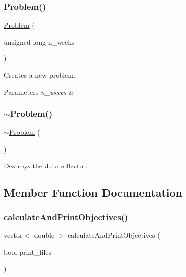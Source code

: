 \subsubsection{\texorpdfstring{Problem()}{Problem()}}
{\footnotesize\ttfamily \mbox{\hyperlink{classProblem}{Problem}} (\begin{DoxyParamCaption}\item[{unsigned long}]{n\+\_\+weeks }\end{DoxyParamCaption})}



Creates a new problem. 


\begin{DoxyParams}{Parameters}
{\em n\+\_\+weeks} & \\
\hline
\end{DoxyParams}
\mbox{\label{classProblem_a3f26d4abc0bb8633f315458b8e1b88b9_a3f26d4abc0bb8633f315458b8e1b88b9}} 
\subsubsection{\texorpdfstring{$\sim$\+Problem()}{~Problem()}}
{\footnotesize\ttfamily $\sim$\mbox{\hyperlink{classProblem}{Problem}} (\begin{DoxyParamCaption}{ }\end{DoxyParamCaption})\hspace{0.3cm}{\ttfamily [virtual]}}



Destroys the data collector. 



\subsection{Member Function Documentation}
\mbox{\label{classProblem_ad4e2da403a38f3ee5d4de19ffdfbd148_ad4e2da403a38f3ee5d4de19ffdfbd148}} 
\subsubsection{\texorpdfstring{calculate\+And\+Print\+Objectives()}{calculateAndPrintObjectives()}}
{\footnotesize\ttfamily vector$<$ double $>$ calculate\+And\+Print\+Objectives (\begin{DoxyParamCaption}\item[{bool}]{print\+\_\+files }\end{DoxyParamCaption})}



